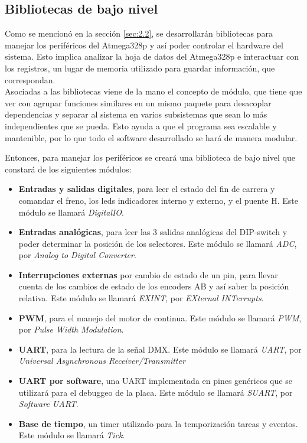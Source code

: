 \subsection{Bibliotecas de bajo nivel}
Como se mencionó en la sección \ref{sec:2.2}, se desarrollarán bibliotecas para manejar los periféricos del Atmega328p y así poder controlar el hardware del sistema. Esto implica analizar la hoja de datos del Atmega328p \cite{sec2_6_2-2} e interactuar con los registros, un lugar de memoria utilizado para guardar información, que correspondan.\\ 
Asociadas a las bibliotecas viene de la mano el concepto de módulo, que tiene que ver con agrupar funciones similares en un mismo paquete para desacoplar dependencias y separar al sistema en varios subsistemas que sean lo más independientes que se pueda. Esto ayuda a que el programa sea escalable y mantenible, por lo que todo el software desarrollado se hará de manera modular.

Entonces, para manejar los periféricos se creará una biblioteca de bajo nivel que constará de los siguientes módulos:
\begin{itemize}
	\item \textbf{Entradas y salidas digitales}, para leer el estado del fin de carrera y comandar el freno, los leds indicadores interno y externo, y el puente H. Este módulo se llamará \textit{DigitalIO}.
	\item \textbf{Entradas analógicas}, para leer las 3 salidas analógicas del DIP-switch y poder determinar la posición de los selectores. Este módulo se llamará \textit{ADC}, por \textit{Analog to Digital Converter}.
	\item \textbf{Interrupciones externas} por cambio de estado de un pin, para llevar cuenta de los cambios de estado de los encoders AB y así saber la posición relativa. Este módulo se llamará \textit{EXINT}, por \textit{EXternal INTerrupts}.
	\item \textbf{PWM}, para el manejo del motor de continua. Este módulo se llamará \textit{PWM}, por \textit{Pulse Width Modulation}.
	\item \textbf{UART}, para la lectura de la señal DMX. Este módulo se llamará \textit{UART}, por \textit{Universal Asynchronous Receiver/Transmitter}
	\item \textbf{UART por software}, una UART implementada en pines genéricos que se utilizará para el debuggeo de la placa. Este módulo se llamará \textit{SUART}, por \textit{Software UART}.
	\item \textbf{Base de tiempo}, un timer utilizado para la temporización tareas y eventos. Este módulo se llamará \textit{Tick}.
\end{itemize}

